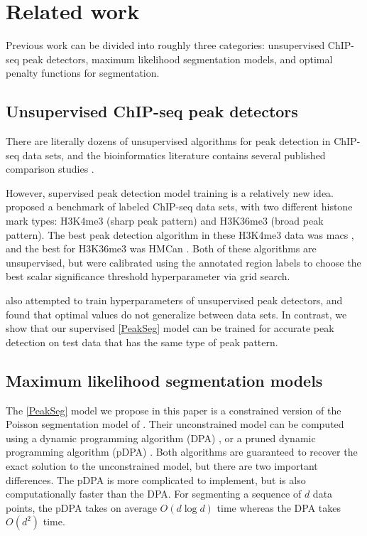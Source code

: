\documentclass{article}
\begin{document}
\section{Related work}
\label{sec:related}

Previous work can be divided into roughly three categories:
unsupervised ChIP-seq peak detectors, maximum likelihood segmentation
models, and optimal penalty functions for segmentation.

\subsection{Unsupervised ChIP-seq peak detectors}

There are literally dozens of unsupervised algorithms for peak
detection in ChIP-seq data sets, and the bioinformatics literature
contains several published comparison studies \citep{evaluation2010,
  rye2010manually, chip-seq-bench}. 

However, supervised peak detection model training is a relatively new
idea. \citet{hocking2014visual} proposed a benchmark of labeled
ChIP-seq data sets, with two different histone mark types: H3K4me3
(sharp peak pattern) and H3K36me3 (broad peak pattern). The best peak
detection algorithm in these H3K4me3 data was macs \citep{MACS}, and
the best for H3K36me3 was HMCan \citep{HMCan}. Both of these
algorithms are unsupervised, but were calibrated using the annotated
region labels to choose the best scalar significance threshold
hyperparameter via grid search.

\citet{DFilter} also attempted to train hyperparameters of
unsupervised peak detectors, and \citet{picking2012} found that
optimal values do not generalize between data sets. In contrast, we
show that our supervised \ref{PeakSeg} model can be trained for
accurate peak detection on test data that has the same type of peak
pattern.

\subsection{Maximum likelihood segmentation models}

The \ref{PeakSeg} model we propose in this paper is a constrained
version of the Poisson segmentation model of \citet{Segmentor}.
Their unconstrained model can be computed using a dynamic programming
algorithm (DPA) \citep{bellman}, or a pruned dynamic programming
algorithm (pDPA) \citep{pruned-dp}. Both algorithms are guaranteed to
recover the exact solution to the unconstrained model, but there are
two important differences. The pDPA is more complicated to implement,
but is also computationally faster than the DPA. For segmenting a
sequence of $d$ data points, the pDPA takes on average $O(d\log d)$
time whereas the DPA takes $O(d^2)$ time. 
\end{document}

